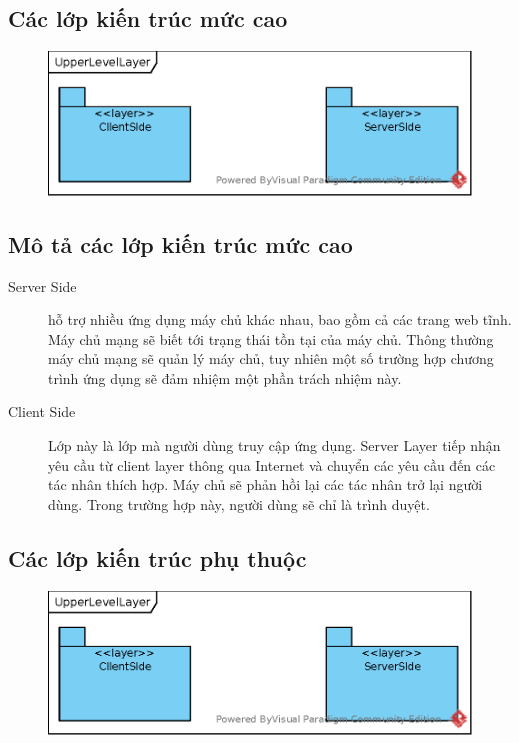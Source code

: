 \documentclass[./../main.tex]{subfiles}
\begin{document}
	\subsection{Các lớp kiến trúc mức cao}
	\begin{figure}[H]
		\centering
		\includegraphics{./images/UpperLevelLayer.eps}
	\end{figure}

	\subsection{Mô tả các lớp kiến trúc mức cao}
	\begin{description}
		\item[Server Side] hỗ trợ nhiều ứng dụng máy chủ khác nhau, bao gồm cả các trang web tĩnh. Máy chủ mạng sẽ biết tới trạng thái tồn tại của máy chủ. Thông thường máy chủ mạng sẽ quản lý máy chủ, tuy nhiên một số trường hợp chương trình ứng dụng sẽ đảm nhiệm một phần trách nhiệm này.
		\item[Client Side]  Lớp này là lớp mà người dùng truy cập ứng dụng. Server Layer tiếp nhận yêu cầu từ client layer thông qua Internet và chuyển các yêu cầu đến các tác nhân thích hợp. Máy chủ sẽ phản hồi lại các tác nhân trở lại  người dùng. Trong trường hợp này, người dùng sẽ chỉ là trình duyệt. 
	\end{description}
	\subsection{Các lớp kiến trúc phụ thuộc}
		\begin{figure}[H]
		\centering
		\includegraphics{./images/UpperLevelLayer.eps}
	\end{figure}
\end{document}
